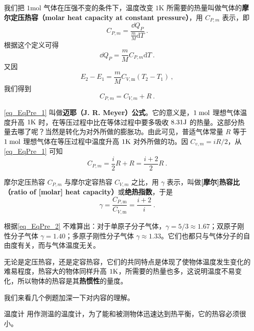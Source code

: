 我们把 $1\mathrm{mol}$ 气体在压强不变的条件下，温度改变 $1\mathrm K$ 所需要的热量叫做气体的\textbf{摩尔定压热容（molar heat capacity at constant pressure）}，用 $C_{P,m}$ 表示，即
\begin{equation}
C_{P, {m}}=\frac{\dd Q_{P}}{\frac{m}{M} \mathrm{d} T}~.
\end{equation}
根据这个定义可得
\begin{equation}
\dd Q_{P}=\frac{m}{M} C_{P, {m}} \mathrm{d} T~.
\end{equation}
又因
\begin{equation}
E_{2}-E_{1}=\frac{m}{M} C_{V, \mathrm{m}}\left(T_{2}-T_{1}\right)~,
\end{equation}
我们得到
\begin{equation} \label{eq_EqPre_1}
C_{P, m}=C_{V, m}+R~.
\end{equation}

\autoref{eq_EqPre_1} 叫做\textbf{迈耶（J. R. Meyer）公式}。它的意义是，$1\; \rm mol$ 理想气体温度升高 $1\rm K$ 时，在等压过程中比在等体过程中要多吸收 $8. 31\rm J $ 的热量。这部分热量去哪了呢？当然是转化为对外所做的膨胀功。由此可见，普适气体常量 $R$ 等于 $1\;\rm mol$ 理想气体在等压过程中温度升高 $1\rm K$ 对外所做的功。因 $C_{v, m}=iR/2$，从\autoref{eq_EqPre_1} 可知
\begin{equation}
C_{P, {m}}=\frac{i}{2} R+R=\frac{i+2}{2} R~.
\end{equation}

摩尔定压热容 $C_{P,m}$ 与摩尔定容热容 $C_{V,m}$ 之比，用 $\gamma$ 表示，叫做\textbf{[摩尔]热容比（ratio of [molar] heat capacity）}或\textbf{绝热指数}，于是
\begin{equation} \label{eq_EqPre_2}
\gamma=\frac{C_{P, \mathrm{m}}}{C_{V, \mathrm{m}}}=\frac{i+2}{i}~.
\end{equation}

根据\autoref{eq_EqPre_2} 不难算出：对于单原子分子气体，$\gamma=5/3\approx 1.67$；双原子刚性分子气体 $\gamma=1.40$；多原子刚性分子气体 $\gamma\approx 1. 33 $。它们也都只与气体分子的自由度有关，而与气体温度无关。

无论是定压热容，还是定容热容，它们的共同特点是体现了使物体温度发生变化的难易程度，热容大的物体同样升高 $1\rm K$，所需要的热量也多，这说明温度不易变化，所以物体的热容是其\textbf{热惯性}的量度。

我们来看几个例题加深一下对内容的理解。

\begin{example}{温度计}
用作测温的温度计，为了能和被测物体迅速达到热平衡，它的热容必须很小。
\end{example}

